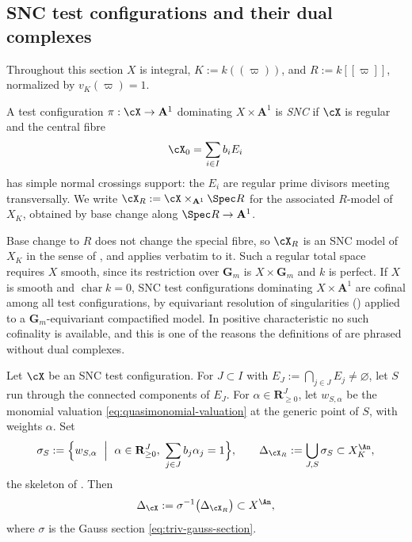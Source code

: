 \subsection{SNC test configurations and their dual complexes}

Throughout this section $X$ is integral, $K:=k((\varpi))$, and
$R:=k[[\varpi]]$, normalized by $v_K(\varpi)=1$.

\begin{definition}
\label{def:ch34-snc-tc}
A test configuration $\pi:\cX\to\mathbf A^1$ dominating
$X\times\mathbf A^1$ is \emph{SNC} if $\cX$ is regular and the central
fibre
\[
 \cX_0=\sum_{i\in I}b_iE_i
\]
has simple normal crossings support: the $E_i$ are regular prime divisors
meeting transversally.  We write $\cX_R:=\cX\times_{\mathbf A^1}\Spec R$
for the associated $R$-model of $X_K$, obtained by base change along
$\Spec R\to\mathbf A^1$.
\end{definition}

Base change to $R$ does not change the special fibre, so $\cX_R$ is an
SNC model of $X_K$ in the sense of , and
 applies verbatim to it.  Such a regular total space
requires $X$ smooth, since its restriction over $\mathbf G_m$ is
$X\times\mathbf G_m$ and $k$ is perfect.  If $X$ is smooth and
$\operatorname{char}k=0$,
SNC test configurations dominating $X\times\mathbf A^1$ are cofinal among
all test configurations, by equivariant resolution of singularities
() applied to a $\mathbf G_m$-equivariant
compactified model.  In positive characteristic no such cofinality is
available, and this is one of the reasons the definitions of
 are phrased without dual complexes.

\begin{definition}
\label{def:ch34-dual-complex}
Let $\cX$ be an SNC test configuration.  For $J\subset I$ with
$E_J:=\bigcap_{j\in J}E_j\ne\varnothing$, let $S$ run through the
connected components of $E_J$.  For
$\alpha\in\mathbf R_{\ge0}^J$, let $w_{S,\alpha}$ be the monomial
valuation \eqref{eq:quasimonomial-valuation} at the generic point of $S$,
with weights $\alpha$.  Set
\[
 \sigma_S:=\Bigl\{w_{S,\alpha}\ \Bigm|\
 \alpha\in\mathbf R_{\ge0}^J,\
 \sum_{j\in J}b_j\alpha_j=1\Bigr\},
 \qquad
 \Delta_{\cX_R}:=\bigcup_{J,S}\sigma_S
 \subset X_K^{\An},
\]
the skeleton of .  Then
\begin{equation}
\label{eq:ch34-dual-complex}
 \Delta_{\cX}:=\sigma^{-1}\bigl(\Delta_{\cX_R}\bigr)\subset X^{\An},
\end{equation}
where $\sigma$ is the Gauss section \eqref{eq:triv-gauss-section}.
\end{definition}


